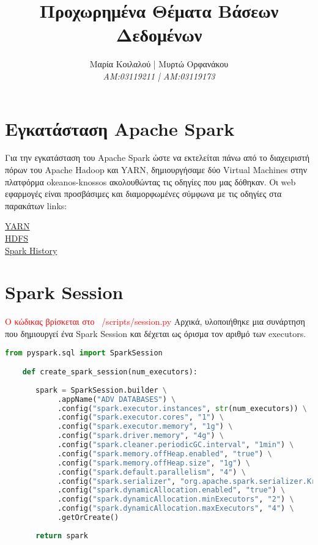 \documentclass{article}
\title{Προχωρημένα Θέματα Βάσεων Δεδομένων}
\author{Μαρία Κοιλαλού | Μυρτώ Ορφανάκου\\
\textit{AM:03119211 | ΑM:03119173}}
\begin{document}
\maketitle

\vspace{3\baselineskip}

\section{Εγκατάσταση Apache Spark}
Για την εγκατάσταση του Apache Spark ώστε να εκτελείται πάνω από το διαχειριστή πόρων του Apache Hadoop και YARN,
δημιουργήσαμε δύο Virtual Machines στην πλατφόρμα okeanos-knossos ακολουθώντας τις οδηγίες που μας δόθηκαν.
Οι web εφαρμογές είναι προσβάσιμες και διαμορφωμένες σύμφωνα με τις οδηγίες στα παρακάτων links: 

\begin{center}
\href{http://83.212.81.191:8088}{YARN} \\
\href{http://83.212.81.191:9870}{HDFS} \\
\href{http://83.212.81.191:18080}{Spark History} \\
\end{center}


\section*{Spark Session}
\textcolor{red}{Ο κώδικας βρίσκεται στο  /scripts/session.py}
Αρχικά, υλοποιήθηκε μια συνάρτηση που δημιουργεί ένα Spark Session και δέχεται ως όρισμα τον αριθμό των executors.

\begin{lstlisting}[language = Python]
    from pyspark.sql import SparkSession

    def create_spark_session(num_executors):
       
       spark = SparkSession.builder \
            .appName("ADV DATABASES") \
            .config("spark.executor.instances", str(num_executors)) \
            .config("spark.executor.cores", "1") \
            .config("spark.executor.memory", "1g") \
            .config("spark.driver.memory", "4g") \
            .config("spark.cleaner.periodicGC.interval", "1min") \
            .config("spark.memory.offHeap.enabled", "true") \
            .config("spark.memory.offHeap.size", "1g") \
            .config("spark.default.parallelism", "4") \
            .config("spark.serializer", "org.apache.spark.serializer.KryoSerializer") \
            .config("spark.dynamicAllocation.enabled", "true") \
            .config("spark.dynamicAllocation.minExecutors", "2") \
            .config("spark.dynamicAllocation.maxExecutors", "4") \
            .getOrCreate()
          
       return spark
\end{lstlisting}
\end{document}
